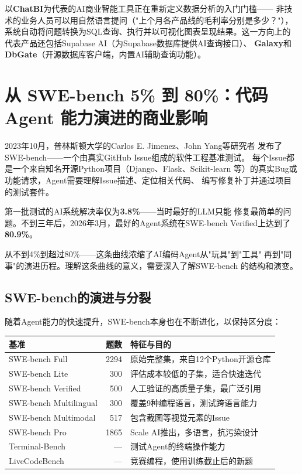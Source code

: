 以\textbf{ChatBI}为代表的AI商业智能工具正在重新定义数据分析的入门门槛——
非技术的业务人员可以用自然语言提问（"上个月各产品线的毛利率分别是多少？"），
系统自动将问题转换为SQL查询、执行并以可视化图表呈现结果。这一方向上的
代表产品还包括Supabase AI（为Supabase数据库提供AI查询接口）、
\textbf{Galaxy}和\textbf{DbGate}（开源数据库客户端，内置AI辅助查询功能）。


\section{从 SWE-bench 5\% 到 80\%：代码 Agent 能力演进的商业影响}
\label{sec:devtools-swebench}

2023年10月，普林斯顿大学的Carlos E. Jimenez、John Yang等研究者
发布了SWE-bench——一个由真实GitHub Issue组成的软件工程基准测试。
每个Issue都是一个来自知名开源Python项目（Django、Flask、Scikit-learn
等）的真实Bug或功能请求，Agent需要理解Issue描述、定位相关代码、
编写修复补丁并通过项目的测试套件。

第一批测试的AI系统解决率仅为\textbf{3.8\%}——当时最好的LLM只能
修复最简单的问题。不到三年后，2026年3月，最好的Agent系统在SWE-bench
Verified上达到了\textbf{80.9\%}。

从不到4\%到超过80\%——这条曲线浓缩了AI编码Agent从"玩具"到"工具"
再到"同事"的演进历程。理解这条曲线的意义，需要深入了解SWE-bench
的结构和演变。

\subsection{SWE-bench的演进与分裂}
\label{subsec:swebench-evolution}

随着Agent能力的快速提升，SWE-bench本身也在不断进化，以保持区分度：

\begin{keybox}
\small
\begin{tabularx}{\textwidth}{l r X}
\toprule
\rowcolor{figLightGray}
\textbf{基准} & \textbf{题数} & \textbf{特征与目的} \\
\midrule
SWE-bench Full      & 2294   & 原始完整集，来自12个Python开源仓库 \\
SWE-bench Lite      & 300    & 评估成本较低的子集，适合快速迭代 \\
SWE-bench Verified  & 500    & 人工验证的高质量子集，最广泛引用 \\
SWE-bench Multilingual & 300 & 覆盖9种编程语言，测试跨语言能力 \\
SWE-bench Multimodal   & 517 & 包含截图等视觉元素的Issue \\
SWE-bench Pro       & 1865   & Scale AI推出，多语言，抗污染设计 \\
Terminal-Bench      & ---    & 测试Agent的终端操作能力 \\
LiveCodeBench       & ---    & 竞赛编程，使用训练截止后的新题 \\
\bottomrule
\end{tabularx}
\end{keybox}

